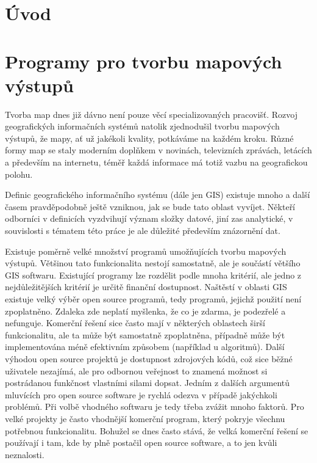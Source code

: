 \documentclass[a4paper,12pt,draft]{article}
\author{Anna Kratochvílová}
\begin{document}
\tableofcontents
\renewcommand{\refname}{Použité zdroje}

\section{Úvod}

\section{Programy pro tvorbu mapových výstupů}

Tvorba map dnes již dávno není pouze věcí specializovaných
pracovišť. Rozvoj geografických informačních systémů natolik
zjednodušil tvorbu mapových výstupů, že mapy, ať už jakékoli kvality,
potkáváme na každém kroku. Různé formy map se staly moderním doplňkem
v novinách, televizních zprávách, letácích a především na internetu,
téměř každá informace má totiž vazbu na geografickou polohu.

Definic geografického informačního systému (dále jen GIS) existuje mnoho
a další časem pravděpodobně ještě vzniknou, jak se bude tato oblast
vyvíjet. Někteří odborníci v definicích vyzdvihují význam složky
datové, jiní zas analytické, v souvislosti s tématem této práce je
ale důležité především znázornění dat.

Existuje poměrně velké množství programů umožňujících tvorbu
mapových výstupů. Většinou tato funkcionalita nestojí samostatně,
ale je součástí většího GIS softwaru. Existující programy lze
rozdělit podle mnoha kritérií, ale jedno z nejdůležitějších
kritérií je určitě finanční dostupnost. Naštěstí v oblasti GIS
existuje velký výběr open source programů, tedy programů, jejichž
použití není zpoplatněno. Zdaleka zde neplatí myšlenka, že co je
zdarma, je podezřelé a nefunguje. Komerční řešení sice často mají v
některých oblastech širší funkcionalitu, ale ta může být samostatně
zpoplatněna, případně může být implementována méně efektivním
způsobem (například u algoritmů). Další výhodou open source projektů
je dostupnost zdrojových kódů, což sice běžné uživatele nezajímá,
ale pro odbornou veřejnost to znamená možnost si postrádanou funkčnost
vlastními silami dopsat. Jedním z dalších argumentů mluvících pro open
source software je rychlá odezva v případě jakýchkoli problémů. Při
volbě vhodného softwaru je tedy třeba zvážit mnoho faktorů. Pro
velké projekty je často vhodnější komerční program, který pokryje
všechnu potřebnou funkcionalitu. Bohužel se dnes často stává, že
velká komerční řešení se používají i tam, kde by plně postačil
open source software, a to jen kvůli neznalosti.
\end{document}
